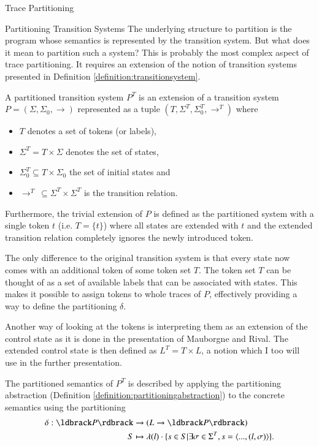 \begin{chapter}{Trace Partitioning}
\begin{section}{Partitioning Transition Systems}
		The underlying structure to partition is the program whose semantics is represented by the transition system. But what does it mean to partition such a system? This is probably the most complex aspect of trace partitioning. It requires an extension of the notion of transition systems presented in Definition \ref{definition:transitionsystem}.

		\begin{definition}
			\label{definition:partitionedsystem}
			A partitioned transition system $P^T$ is an extension of a transition system $P = (\Sigma, \Sigma_0, \to)$ represented as a tuple $(T, \Sigma^T, \Sigma_0^T, \to^T)$ where 
			\begin{itemize}
				\item $T$ denotes a set of tokens (or labels),
				\item $\Sigma^T = T \times \Sigma$ denotes the set of states,
				\item $\Sigma_0^T \subseteq T \times \Sigma_0$ the set of initial states and
				\item $\to^T \ \subseteq \Sigma^T \times \Sigma^T$ is the transition relation.
			\end{itemize}

			Furthermore, the trivial extension of $P$ is defined as the partitioned system with a single token $t$ (i.e. $T = \{t\}$) where all states are extended with $t$ and the extended transition relation completely ignores the newly introduced token.
		\end{definition}

		The only difference to the original transition system is that every state now comes with an additional token of some token set $T$. The token set $T$ can be thought of as a set of available labels that can be associated with states. This makes it possible to assign tokens to whole traces of $P$, effectively providing a way to define the partitioning $\delta$.

		Another way of looking at the tokens is interpreting them as an extension of the control state as it is done in the presentation of Mauborgne and Rival. The extended control state is then defined as $L^T = T \times L$, a notion which I too will use in the further presentation.

		\begin{definition}
			The partitioned semantics  of $P^T$ is described by applying the partitioning abstraction (Definition \ref{definition:partitioningabstraction}) to the concrete semantics using the partitioning
			\begin{align}
				\delta: \concrete{P} &\to (L \to \concrete{P})\\
				S &\mapsto \lambda(l) \cdot \{s \in S | \exists \sigma \in \Sigma^T, s = \langle ..., (l, \sigma) \rangle \}. \notag
			\end{align}
		\end{definition}


\end{section}
\end{chapter}
